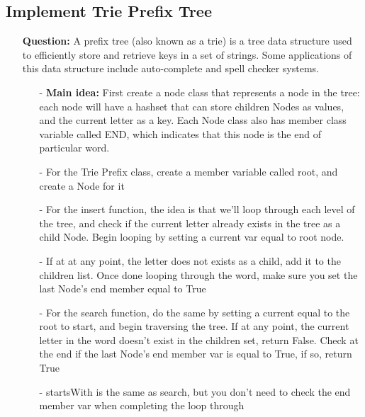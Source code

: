 \documentclass[12pt]{article}
\begin{document}
\subsection{Implement Trie Prefix Tree}
\begin{enumerate}
  \item[] \textbf{Question:} A prefix tree (also known as a trie) is a tree data structure used to efficiently store and retrieve keys in a set of strings. Some applications of this data structure include auto-complete and spell checker systems.

    \begin{enumerate}
      \item[-] \textbf{Main idea:} First create a node class that represents a node in the tree: each node will have a hashset that can store children Nodes as values, and the current letter as a key. Each Node class also has member class variable called END, which indicates that this node is the end of particular word.
      \item[-] For the Trie Prefix class, create a member variable called root, and create a Node for it
      \item[-] For the insert function, the idea is that we'll loop through each level of the tree, and check if the current letter already exists in the tree as a child Node. Begin looping by setting a current var equal to root node. 
      \item[-] If at at any point, the letter does not exists as a child, add it to the children list. Once done looping through the word, make sure you set the last Node's end member equal to True
      \item[-] For the search function, do the same by setting a current equal to the root to start, and begin traversing the tree. If at any point, the current letter in the word doesn't exist in the children set, return False. Check at the end if the last Node's end member var is equal to True, if so, return True
      \item[-] startsWith is the same as search, but you don't need to check the end member var when completing the loop through

    \end{enumerate}
\end{enumerate}
\end{document}
